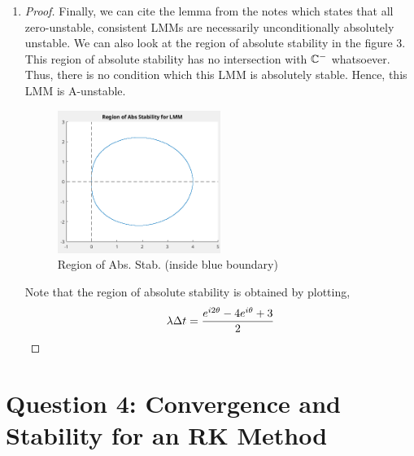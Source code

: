 \documentclass{article}
\begin{document}
\begin{enumerate}[label=\alph*)]
  \item 

  \begin{proof}
    Finally, we can cite the lemma from the notes which states that all
    zero-unstable, consistent LMMs are necessarily unconditionally absolutely
    unstable. We can also look at the region of absolute stability in the figure
    3. This region of absolute stability has no intersection with $\mathbb{C}^-$
    whatsoever. Thus, there is no condition which this LMM is absolutely stable.
    Hence, this LMM is A-unstable. 
    \begin{figure}[h]
        \centering
        \includegraphics[width=0.5\textwidth]{3cAbsStabRegion.png}
        \caption{Region of Abs. Stab. (inside blue boundary)}
    \end{figure}

    Note that the region of absolute stability is obtained by plotting,
    \begin{align*}
        \lambda\Delta t = \frac{e^{i2\theta} - 4e^{i\theta} + 3}{2}
    \end{align*}

  \end{proof}

\end{enumerate}

\section*{Question 4: Convergence and Stability for an RK Method}
\end{document}
